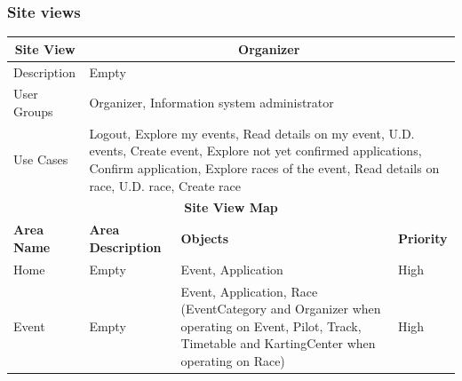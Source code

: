 \documentclass{beamer}
\begin{document}
\begin{frame}
    \frametitle{Site views}
    \begin{table}
        \centering
        \tiny
        \setlength{\tabcolsep}{1pt}
        \begin{tabular}{|m{2cm}|m{4cm}|m{3cm}|m{1cm}|}
        \hline
        \multicolumn{1}{|c|}{\textbf{Site View}} & \multicolumn{3}{c|}{\textbf{Organizer}} \\
        \hline
        Description & \multicolumn{3}{m{8cm}|}{Empty} \\
        \hline
        User Groups & \multicolumn{3}{m{8cm}|}{Organizer, Information system administrator} \\
        \hline
        Use Cases & \multicolumn{3}{m{8cm}|}{Logout, Explore my events, Read details on my event,
        U.D. events, Create event, Explore not yet confirmed applications, Confirm application, 
        Explore races of the event, Read details on race, U.D. race, Create race} \\
        \hline
        \multicolumn{4}{|c|}{\textbf{Site View Map}} \\
        \hline
        \textbf{Area Name} & \textbf{Area Description} & \textbf{Objects} & \textbf{Priority} \\
        \hline
        Home & Empty & Event, Application & High \\
        \hline
        Event & Empty & Event, Application, Race (EventCategory and Organizer when operating on Event,
        Pilot, Track, Timetable and KartingCenter when operating on Race)
        & High \\
        \hline
        \end{tabular}
    \end{table}
\end{frame}
\end{document}
